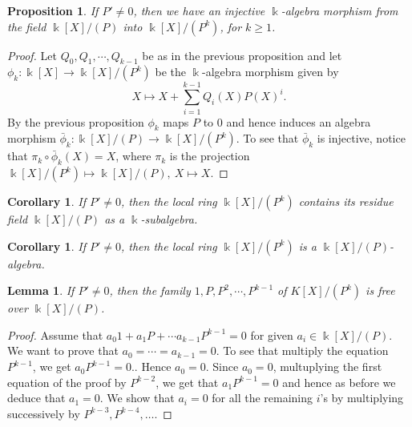 \documentclass[12pt, reqno]{amsart}
\newtheorem{proposition}[theorem]{Proposition}
\newtheorem{corollary}[theorem]{Corollary}
\newtheorem{lemma}[theorem]{Lemma}
\newcommand{\K}{ {\Bbbk} }
\begin{document}
\begin{proposition}
 If $ P'\neq  0$, then we have an injective $\K$-algebra morphism from the field $\K[X]/(P)$ into $\K[X]/(P^k)$, for $k \geq 1$.
\end{proposition}
\begin{proof}
Let $Q_0,Q_1,\cdots,Q_{k-1}$ be as in the previous proposition and let $\phi_k : \K[X] \to \K[X]/(P^k)$ be the $\K$-algebra morphism given by $$ X\mapsto X+\overset{k-1}{\underset{i=1}{\sum}} Q_i(X)P(X)^i.$$
By the previous proposition $\phi_k$ maps $P$ to $0$ and hence induces an algebra morphism $\bar{\phi}_k : \K[X]/(P) \to \K[X]/(P^k)$. To see that $\bar{\phi}_k$ is injective, notice that $\pi_k\circ \bar{\phi}_k(X)=X$, where $\pi_k$ is the projection $\K[X]/(P^k) \mapsto \K[X]/(P), \ X\mapsto X$.
\end{proof}

\begin{corollary}
If $P' \neq 0$, then the local ring $\K [X] / (P^k)$ contains its residue field $\K [X]/(P)$ as a $\K$-subalgebra.
\end{corollary}

\begin{corollary}
If $P' \neq 0$, then the local ring $\K [X] / (P^k)$ is a $\K [X]/(P)$-algebra.
\end{corollary}

\begin{lemma}
If $P' \neq 0$, then the family $1, P,P^2,\cdots,P^{k-1}$ of $K[X]/(P^k)$ is free over $\K[X]/(P)$. 
\end{lemma}
\begin{proof}
Assume that $a_0 1 + a_1P +\cdots a_{k-1} P^{k-1}=0$ for given $a_i \in \K[X]/(P)$. We want to prove that $a_0=\cdots=a_{k-1}=0$. To see that multiply the equation $P^{k-1}$, we get $a_0P^{k-1}=0.$. Hence $a_0=0$. Since $a_0=0$, multuplying the first equation of the proof by $P^{k-2}$, we get that $a_1P^{k-1}=0$ and hence as before we deduce that $a_1=0$. We show that $a_i=0$ for all the remaining $i$'s by multiplying successively by $P^{k-3},P^{k-4},\dots$.
\end{proof}
\end{document}
